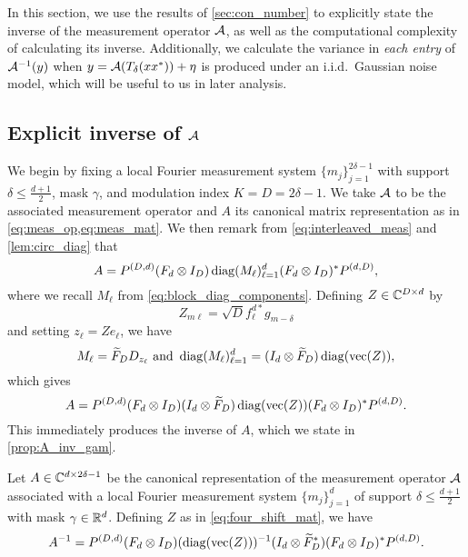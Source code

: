In this section, we use the results of \cref{sec:con_number} to explicitly state the inverse of the measurement operator $\mathcal{A}$, as well as the computational complexity of calculating its inverse.  Additionally, we calculate the variance in \emph{each entry} of $\mathcal{A}^{-1}(y)$ when $y = \mathcal{A}(T_\delta(x x^*)) + \eta$ is produced under an i.i.d.~Gaussian noise model, which will be useful to us in later analysis.

\subsection{Explicit inverse of $\mathcal{A}$}
\label{sec:inv_runtime}

We begin by fixing a local Fourier measurement system $\{m_j\}_{j = 1}^{2 \delta - 1}$ with support $\delta \le \frac{d + 1}{2}$, mask $\gamma$, and modulation index $K = D = 2 \delta - 1$.  We take $\mathcal{A}$ to be the associated measurement operator and $A$ its canonical matrix representation as in \cref{eq:meas_op,eq:meas_mat}.  We then remark from \eqref{eq:interleaved_meas} and \cref{lem:circ_diag} that \[A = P^{(D, d)} (F_d \otimes I_D) \operatorname{diag}(M_\ell)_{\ell = 1}^d (F_d \otimes I_D)^* P^{(d, D)},\]  where we recall $M_\ell$ from \eqref{eq:block_diag_components}.  Defining $Z \in \mathbb{C}^{D \times d}$ by \begin{equation} Z_{m \ell} = \sqrt{D} f_\ell^{d*} g_{m - \delta} \label{eq:four_shift_mat}\end{equation} and setting $z_\ell = Z e_\ell$, we have \begin{equation} M_\ell = \tF_D D_{z_\ell} \ \text{and} \ \diag(M_\ell)_{\ell = 1}^d = (I_d \otimes \tF_D) \diag(\vec(Z)), \label{eq:M_rearr} \end{equation} which gives \[A = P^{(D, d)} (F_d \otimes I_D) (I_d \otimes \widetilde{F}_D) \operatorname{diag}(\operatorname{vec}(Z)) (F_d \otimes I_D)^* P^{(d, D)}.\]  This immediately produces the inverse of $A$, which we state in \cref{prop:A_inv_gam}.

\begin{proposition}
  Let $A \in \mathbb{C}^{d \times 2 \delta - 1}$ be the canonical representation of the measurement operator $\mathcal{A}$ associated with a local Fourier measurement system $\{m_j\}_{j = 1}^d$ of support $\delta \le \frac{d + 1}{2}$ with mask $\gamma \in \mathbb{R}^d$.  Defining $Z$ as in \eqref{eq:four_shift_mat}, we have
  \begin{equation} A^{-1} = P^{(D, d)} (F_d \otimes I_D) (\operatorname{diag}(\operatorname{vec}(Z)))^{-1} (I_d \otimes \widetilde{F}_D^*) (F_d \otimes I_D)^* P^{(d, D)}. \label{eq:A_inv_gam} \end{equation}
  \label{prop:A_inv_gam}
\end{proposition}

